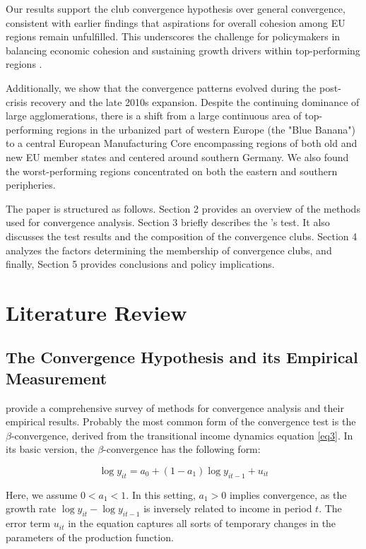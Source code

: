 \documentclass[11pt]{article}
\begin{document}
Our results support the club convergence hypothesis over general convergence, consistent with earlier findings that aspirations for overall cohesion among EU regions remain unfulfilled. This underscores the challenge for policymakers in balancing economic cohesion and sustaining growth drivers within top-performing regions \citep{iammarino2017regional}.

 Additionally, we show that the convergence patterns evolved during the post-crisis recovery and the late 2010s expansion. Despite the continuing dominance of large agglomerations, there is a shift from a large continuous area of top-performing regions in the urbanized part of western Europe (the "Blue Banana") to a central European Manufacturing Core encompassing regions of both old and new EU member states and centered around southern Germany. We also found the worst-performing regions concentrated on both the eastern and southern peripheries.

The paper is structured as follows. Section 2 provides an overview of the methods used for convergence analysis. Section 3 briefly describes the \citeauthor{phillips2007transition}'s test. It also discusses the test results and the composition of the convergence clubs. Section 4 analyzes the factors determining the membership of convergence clubs, and finally, Section 5 provides conclusions and policy implications.  


\section{Literature Review}\label{Methodology}
\subsection{The Convergence Hypothesis and its Empirical Measurement}

\citet{eckey2007convergence} provide a comprehensive survey of methods for convergence analysis and their empirical results. Probably the most common form of the convergence test is the $\beta$-convergence, derived from the transitional income dynamics equation \eqref{eq3}. In its basic version, the $\beta$-convergence has the following form:

\begin{equation}
\label{eq1}\log y_{it} = a_{0} + (1 - a_{1})\log y_{it-1} + u_{it}
\end{equation}

Here, we assume \(0 < a_{1} < 1\). In this setting, \(a_{1} > 0 \) implies convergence, as the growth rate \(\log y_{it} - \log y_{it-1}\) is inversely related to income in period $t$. The error term $u_{it}$ in the equation captures all sorts of temporary changes in the parameters of the production function.
\end{document}
